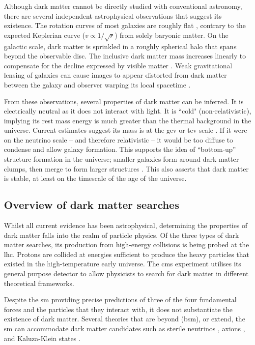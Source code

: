 Although dark matter cannot be directly studied with conventional astronomy, there are several independent astrophysical observations that suggest its existence. The rotation curves of most galaxies are roughly flat \cite{1996MNRAS-281-27P}, contrary to the expected Keplerian curve ($v \propto 1/\sqrt{r}$) from solely baryonic matter. On the galactic scale, dark matter is sprinkled in a roughly spherical halo that spans beyond the observable disc. The inclusive dark matter mass increases linearly \cite{2009arXiv0901.0632E} to compensate for the decline expressed by visible matter \cite{1970ApJ-160-811F,1992AandA-256-19B}. Weak gravitational lensing of galaxies can cause images to appear distorted from dark matter between the galaxy and observer warping its local spacetime \cite{2010GReGr..42.2177H}.

From these observations, several properties of dark matter can be inferred. It is electrically neutral as it does not interact with light. It is ``cold" (non-relativistic), implying its rest mass energy is much greater than the thermal background in the universe. Current estimates suggest its mass is at the \acrfull{gev} or \acrfull{tev} scale \cite{Lowette:2014yta,1742-6596-651-1-012023,Hong:2017avi}. If it were on the neutrino scale -- and therefore relativistic -- it would be too diffuse to condense and allow galaxy formation. This supports the idea of ``bottom-up'' structure formation in the universe; smaller galaxies form around dark matter clumps, then merge to form larger structures \cite{doi:10.1093-mnras-183.3.341}. This also asserts that dark matter is stable, at least on the timescale of the age of the universe.


\subsection{Overview of dark matter searches}
\label{subsec:intro_dm_searches}

Whilst all current evidence has been astrophysical, determining the properties of dark matter falls into the realm of particle physics. Of the three types of dark matter searches, its production from high-energy collisions is being probed at the \acrshort{lhc}. Protons are collided at energies sufficient to produce the heavy particles that existed in the high-temperature early universe. The \acrfull{cms} experiment utilises its general purpose detector to allow physicists to search for dark matter in different theoretical frameworks.

Despite the \acrlong{sm} providing precise predictions of three of the four fundamental forces and the particles that they interact with, it does not substantiate the existence of dark matter. Several theories that are beyond (\acrshort{bsm}), or extend, the \acrlong{sm} can accommodate dark matter candidates such as sterile neutrinos \cite{doi:10.1142/S0218301313300191}, axions \cite{1981PhLB..104..199D}, and Kaluza-Klein states \cite{Han:1998sg}.

